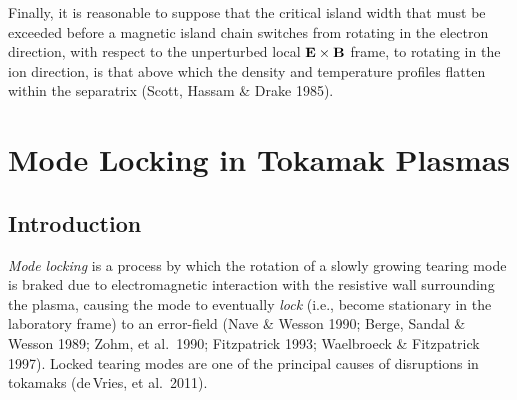 \documentclass[notitlepage,12pt]{article}
\begin{document}
Finally, it is reasonable to suppose that the critical island width that must be exceeded before a magnetic island chain switches from rotating in the electron
direction, with respect to the unperturbed local ${\bf E}\times{\bf B}$ frame, to rotating in the ion direction, is  that
above which the density and temperature profiles flatten within the separatrix (Scott, Hassam \& Drake 1985). 

\section{Mode Locking in Tokamak Plasmas}
\subsection{Introduction}
{\em Mode locking}\/ is a process by which the rotation of a slowly growing  tearing mode is braked  due to electromagnetic interaction with the 
resistive wall surrounding the plasma, causing the mode to eventually {\em lock}\/ (i.e., become stationary in the laboratory frame) to an error-field
(Nave \& Wesson 1990; Berge, Sandal \& Wesson 1989; Zohm, et al.\ 1990; Fitzpatrick 1993; Waelbroeck \& Fitzpatrick 1997). Locked tearing modes are one of the principal causes of disruptions in tokamaks (de\,Vries, et al.\ 2011). 
\end{document}
